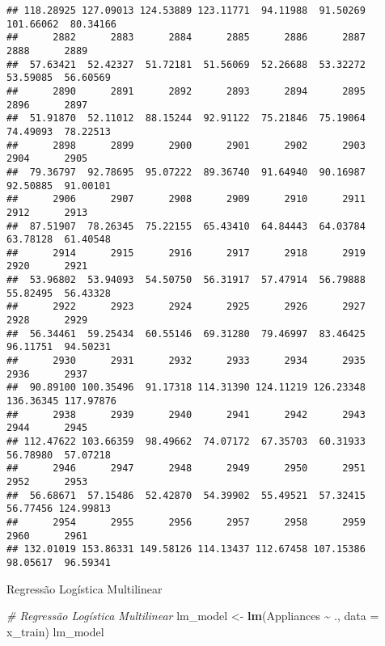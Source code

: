 \documentclass[
]{article}
\newenvironment{Shaded}{\begin{snugshade}}{\end{snugshade}}
\newcommand{\AttributeTok}[1]{\textcolor[rgb]{0.13,0.29,0.53}{#1}}
\newcommand{\CommentTok}[1]{\textcolor[rgb]{0.56,0.35,0.01}{\textit{#1}}}
\newcommand{\FunctionTok}[1]{\textcolor[rgb]{0.13,0.29,0.53}{\textbf{#1}}}
\newcommand{\NormalTok}[1]{#1}
\newcommand{\OtherTok}[1]{\textcolor[rgb]{0.56,0.35,0.01}{#1}}
\newcommand{\SpecialCharTok}[1]{\textcolor[rgb]{0.81,0.36,0.00}{\textbf{#1}}}
\begin{document}
\begin{verbatim}
## 118.28925 127.09013 124.53889 123.11771  94.11988  91.50269 101.66062  80.34166 
##      2882      2883      2884      2885      2886      2887      2888      2889 
##  57.63421  52.42327  51.72181  51.56069  52.26688  53.32272  53.59085  56.60569 
##      2890      2891      2892      2893      2894      2895      2896      2897 
##  51.91870  52.11012  88.15244  92.91122  75.21846  75.19064  74.49093  78.22513 
##      2898      2899      2900      2901      2902      2903      2904      2905 
##  79.36797  92.78695  95.07222  89.36740  91.64940  90.16987  92.50885  91.00101 
##      2906      2907      2908      2909      2910      2911      2912      2913 
##  87.51907  78.26345  75.22155  65.43410  64.84443  64.03784  63.78128  61.40548 
##      2914      2915      2916      2917      2918      2919      2920      2921 
##  53.96802  53.94093  54.50750  56.31917  57.47914  56.79888  55.82495  56.43328 
##      2922      2923      2924      2925      2926      2927      2928      2929 
##  56.34461  59.25434  60.55146  69.31280  79.46997  83.46425  96.11751  94.50231 
##      2930      2931      2932      2933      2934      2935      2936      2937 
##  90.89100 100.35496  91.17318 114.31390 124.11219 126.23348 136.36345 117.97876 
##      2938      2939      2940      2941      2942      2943      2944      2945 
## 112.47622 103.66359  98.49662  74.07172  67.35703  60.31933  56.78980  57.07218 
##      2946      2947      2948      2949      2950      2951      2952      2953 
##  56.68671  57.15486  52.42870  54.39902  55.49521  57.32415  56.77456 124.99813 
##      2954      2955      2956      2957      2958      2959      2960      2961 
## 132.01019 153.86331 149.58126 114.13437 112.67458 107.15386  98.05617  96.59341
\end{verbatim}

Regressão Logística Multilinear

\begin{Shaded}
\begin{Highlighting}[]
\CommentTok{\# Regressão Logística Multilinear}
\NormalTok{lm\_model }\OtherTok{\textless{}{-}} \FunctionTok{lm}\NormalTok{(Appliances }\SpecialCharTok{\textasciitilde{}}\NormalTok{ ., }\AttributeTok{data =}\NormalTok{ x\_train)}
\NormalTok{lm\_model}
\end{Highlighting}
\end{Shaded}
\end{document}

